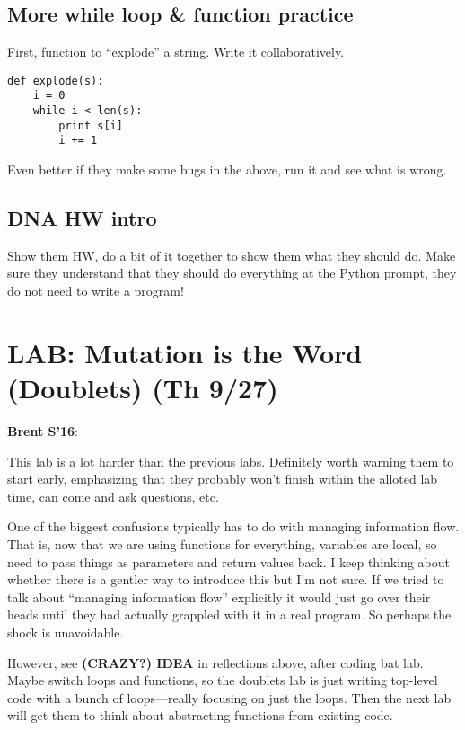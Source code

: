 \documentclass{article}
\newenvironment{reflect}[1]
{
  \noindent
  \begin{lrbox}{\reflectbox}
    \begin{minipage}[t]{\textwidth}
      \textbf{#1}:
}{
    \end{minipage}
  \end{lrbox}
  \fbox{\usebox{\reflectbox}}
}
\begin{document}
\subsection*{More while loop \& function practice}

First, function to ``explode'' a string.  Write it collaboratively.

\begin{verbatim}
def explode(s):
    i = 0
    while i < len(s):
        print s[i]
        i += 1
\end{verbatim}

Even better if they make some bugs in the above, run it and see what
is wrong.

\subsection*{DNA HW intro}

Show them HW, do a bit of it together to show them what they should
do.  Make sure they understand that they should do everything at the
Python prompt, they do not need to write a program!

\newpage
\section*{LAB: Mutation is the Word (Doublets) (Th 9/27)}

\begin{reflect}{Brent S'16}
  This lab is a lot harder than the previous labs.  Definitely worth
  warning them to start early, emphasizing that they probably won't
  finish within the alloted lab time, can come and ask questions, etc.

  One of the biggest confusions typically has to do with managing
  information flow.  That is, now that we are using functions for
  everything, variables are local, so need to pass things as
  parameters and return values back.  I keep thinking about whether
  there is a gentler way to introduce this but I'm not sure.  If we
  tried to talk about ``managing information flow'' explicitly it
  would just go over their heads until they had actually grappled with
  it in a real program.  So perhaps the shock is unavoidable.

  However, see \textbf{(CRAZY?) IDEA} in reflections above, after
  coding bat lab.  Maybe switch loops and functions, so the doublets
  lab is just writing top-level code with a bunch of loops---really
  focusing on just the loops.  Then the next lab will get them to
  think about abstracting functions from existing code.
\end{reflect}
\end{document}
